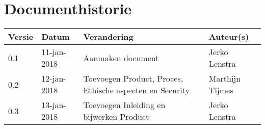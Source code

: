 \section{Documenthistorie}

\begin{tabularx}{\textwidth}{| l | l | X | l |}
    \hline
    \textbf{Versie} & \textbf{Datum} & \textbf{Verandering} & \textbf{Auteur(s)}
    \\ \hline
    0.1	& 11-jan-2018 & Aanmaken document & Jerko Lenstra \\ \hline
    0.2 & 12-jan-2018 & Toevoegen Product, Proces, Ethische aspecten en Security
     & Marthijn Tijmes \\ \hline
    0.3 & 13-jan-2018 & Toevoegen Inleiding en bijwerken Product & Jerko Lenstra \\ \hline

\end{tabularx}
